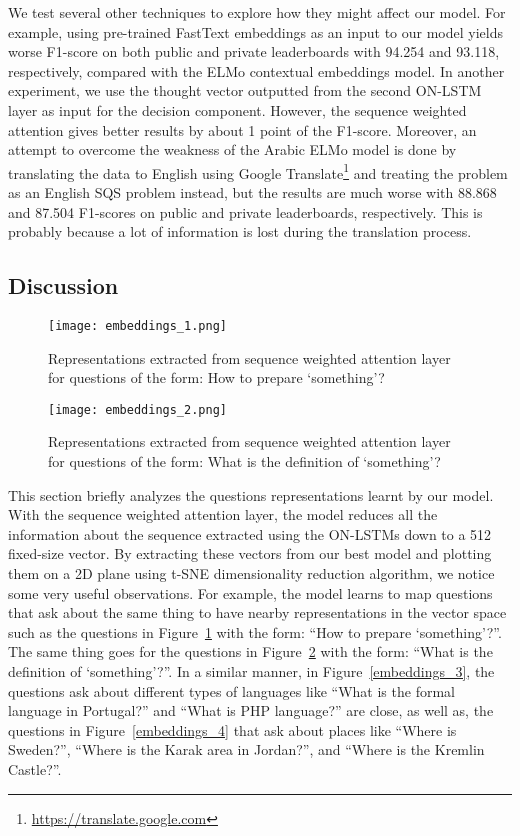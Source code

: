 \documentclass[11pt,a4paper]{article}
\begin{document}
We test several other techniques to explore how they might affect our model. For example, using pre-trained FastText \cite{bojanowski2017enriching} embeddings as an input to our model yields worse F1-score on both public and private leaderboards with 94.254 and 93.118, respectively, compared with the ELMo contextual embeddings model. In another experiment, we use the thought vector outputted from the second ON-LSTM layer as input for the decision component. However, the sequence weighted attention gives better results by about 1 point of the F1-score. Moreover, an attempt to overcome the weakness of the Arabic ELMo model is done by translating the data to English using Google Translate\footnote{\url{https://translate.google.com}} and treating the problem as an English SQS problem instead, but the results are much worse with 88.868 and 87.504 F1-scores on public and private leaderboards, respectively. This is probably because a lot of information is lost during the translation process.

\subsection{Discussion}

\begin{figure}
    \centering
    \texttt{[image: embeddings\_1.png]}
    \caption{Representations extracted from sequence weighted attention layer for questions of the form: How to prepare `something'?}
    \label{embeddings_1}
\end{figure}

\begin{figure}
    \centering
    \texttt{[image: embeddings\_2.png]}
    \caption{Representations extracted from sequence weighted attention layer for questions of the form: What is the definition of `something'?}
    \label{embeddings_2}
\end{figure}

This section briefly analyzes the questions representations learnt by our model. With the sequence weighted attention layer, the model reduces all the information about the sequence extracted using the ON-LSTMs down to a 512 fixed-size vector. By extracting these vectors from our best model and plotting them on a 2D plane using t-SNE \cite{maaten2008visualizing} dimensionality reduction algorithm, we notice some very useful observations. For example, the model learns to map questions that ask about the same thing to have nearby representations in the vector space such as the questions in Figure~\ref{embeddings_1} with the form: ``How to prepare `something'?''. The same thing goes for the questions in Figure~\ref{embeddings_2} with the form: ``What is the definition of `something'?''. In a similar manner, in Figure~\ref{embeddings_3}, the questions ask about different types of languages like ``What is the formal language in Portugal?'' and ``What is PHP language?'' are close, as well as, the questions in Figure~\ref{embeddings_4} that ask about places like ``Where is Sweden?'', ``Where is the Karak area in Jordan?'', and ``Where is the Kremlin Castle?''.
\end{document}
